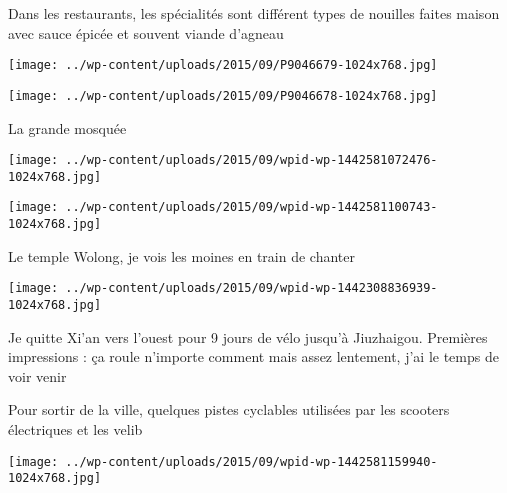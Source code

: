  

 Dans les restaurants, les spécialités sont différent types de nouilles faites maison avec sauce épicée et souvent viande d'agneau 

 

\begin{center} \texttt{[image: ../wp-content/uploads/2015/09/P9046679-1024x768.jpg]} \end{center}

 

 

\begin{center} \texttt{[image: ../wp-content/uploads/2015/09/P9046678-1024x768.jpg]} \end{center}

 

 La grande mosquée 

 

\begin{center} \texttt{[image: ../wp-content/uploads/2015/09/wpid-wp-1442581072476-1024x768.jpg]} \end{center}

 

 

\begin{center} \texttt{[image: ../wp-content/uploads/2015/09/wpid-wp-1442581100743-1024x768.jpg]} \end{center}

 

 Le temple Wolong, je vois les moines en train de chanter 

 

\begin{center} \texttt{[image: ../wp-content/uploads/2015/09/wpid-wp-1442308836939-1024x768.jpg]} \end{center}

 

 Je quitte Xi'an vers l'ouest pour 9 jours de vélo jusqu'à Jiuzhaigou. Premières impressions : ça roule n'importe comment mais assez lentement, j'ai le temps de voir venir 

 Pour sortir de la ville, quelques pistes cyclables utilisées par les scooters électriques et les velib 

 

\begin{center} \texttt{[image: ../wp-content/uploads/2015/09/wpid-wp-1442581159940-1024x768.jpg]} \end{center}

